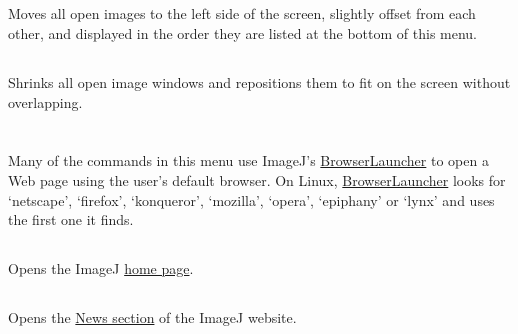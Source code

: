 

\subsection{\protect{}}

Moves all open images to the left side of the screen, slightly offset
from each other, and displayed in the order they are listed at the
bottom of this menu. 


\subsection{\protect{}}

Shrinks all open image windows and repositions them to fit on the
screen without overlapping.

\clearpage{}


\section{\protect{}\label{sec:Help}}

Many of the commands in this menu use ImageJ's \href{http://imagej.nih.gov/ij/developer/source/ij/plugin/BrowserLauncher.java.html}{BrowserLauncher}
to open a Web page using the user's default browser.
On Linux, \href{http://imagej.nih.gov/ij/developer/source/ij/plugin/BrowserLauncher.java.html}{BrowserLauncher}
looks for `netscape', `firefox', `konqueror', `mozilla', `opera',
`epiphany' or `lynx' and uses the first one it finds. 


\subsection{\protect{}}

Opens the ImageJ \href{http://imagej.nih.gov/ij/}{home page}.


\subsection{\protect{}\label{sub:ImageJ-News...}}

Opens the \href{http://imagej.nih.gov/ij/notes.html}{News section}
of the ImageJ website.


\subsection{\protect{}\label{sub:Documentation...}}

